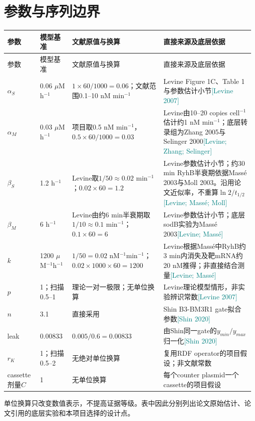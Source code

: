 \documentclass[UTF8,a4paper,11pt,fontset=windows]{ctexart}
\newcommand{\citebox}[1]{\textcolor{Teal}{[#1]}}
\begin{document}
\section{参数与序列边界}
{\footnotesize
\begin{longtable}{@{}p{}p{}p{}p{}@{}}
\toprule
参数 & 模型基准 & 文献原值与换算 & 直接来源及底层依据\\\midrule
\endfirsthead
\toprule
参数 & 模型基准 & 文献原值与换算 & 直接来源及底层依据\\\midrule
\endhead
$\alpha_S$ & 0.06 $\mu$M h$^{-1}$ & $1\times60/1000=0.06$；文献范围0.1--10 nM min$^{-1}$ & Levine Figure 1C、Table 1与参数估计小节\citebox{Levine 2007}\\
$\alpha_M$ & 0.03 $\mu$M h$^{-1}$ & 项目取0.5 nM min$^{-1}$，$0.5\times60/1000=0.03$ & Levine由10--20 copies cell$^{-1}$估计约1 nM min$^{-1}$；底层转录组为Zhang 2005与Selinger 2000\citebox{Levine; Zhang; Selinger}\\
$\beta_S$ & 1.2 h$^{-1}$ & Levine取$1/50\approx0.02$ min$^{-1}$；$0.02\times60=1.2$ & Levine参数估计小节；约30 min RyhB半衰期依据Massé 2003与Moll 2003。沿用论文近似率，不重算$\ln2/t_{1/2}$\citebox{Levine; Massé; Moll}\\
$\beta_M$ & 6 h$^{-1}$ & Levine由约6 min半衰期取$1/10\approx0.1$ min$^{-1}$；$0.1\times60=6$ & Levine参数估计小节；底层sodB实验为Massé 2003\citebox{Levine; Massé}\\
$k$ & 1200 $\mu$M$^{-1}$h$^{-1}$ & $1/50=0.02$ nM$^{-1}$min$^{-1}$；$0.02\times1000\times60=1200$ & Levine根据Massé中RyhB约3 min内消失及靶mRNA约20 nM推得；非直接结合测量\citebox{Levine; Massé}\\
$p$ & 1；扫描0.5--1 & 理论一对一极限；无单位换算 & Levine理论模型情形，非实验辨识常数\citebox{Levine 2007}\\
$n$ & 3.1 & 直接采用 & Shin B3-BM3R1 gate拟合参数\citebox{Shin 2020}\\
leak & 0.00833 & $0.005/0.6=0.00833$ & 由Shin同一gate的$y_{min}/y_{max}$归一化\citebox{Shin 2020}\\
$r_K$ & 1；扫描0.5--2 & 无绝对单位换算 & 复用RDF operator的项目假设；非文献常数\\
cassette剂量$C$ & 1 & 无单位换算 & 每个counter plasmid一个cassette的项目假设\\
\bottomrule
\end{longtable}}

单位换算只改变数值表示，不提高证据等级。表中因此分别列出论文原始估计、论文引用的底层实验和本项目选择的设计点。
\end{document}
